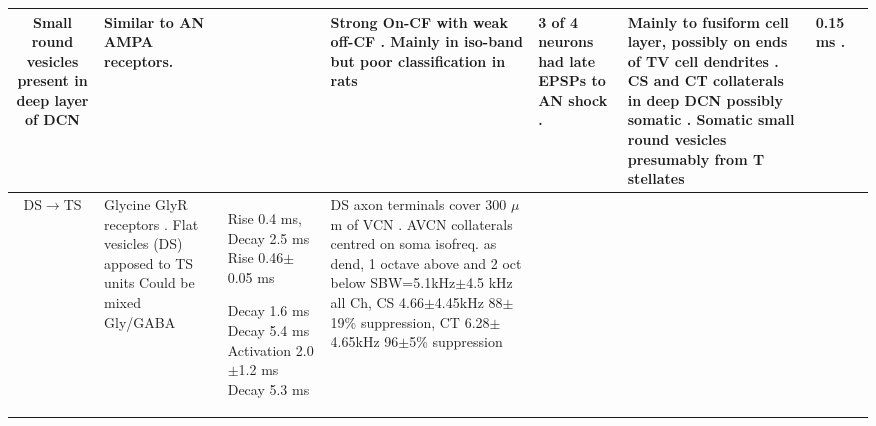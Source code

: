 \begin{longtable}{cYYYYYYY}
Small round vesicles present in deep layer of DCN \citep[guinea pig][]{Alibardi:1999}
& 
Similar to AN AMPA receptors.        
& %
& %
Strong On-CF with weak off-CF  \citep[See fig 13][]{OstapoffBensonEtAl:1999}. 
Mainly in iso-band but poor classification in rats \citep{DoucetRossEtAl:1999,FriedlandPongstapornEtAl:2003}         
& %
3 of 4 neurons had late EPSPs to AN shock \citep[very young mice][]{ZhangOertel:1993}.
\citep{OstapoffMorestEtAl:1999} 
& %
Mainly to fusiform cell layer, possibly on ends of TV cell dendrites \citep[mouse][]{OertelWuEtAl:1990}. 
CS and CT collaterals in deep DCN possibly somatic \citep[guinea pig][]{PalmerWallaceEtAl:2003}.
Somatic small round vesicles presumably from T stellates  \citep[guinea pig][]{Alibardi:1999}   
& %
0.15 ms \citep[min EPSP latency to VCN Glutamate puffs, main excitation at 0.3 ms, AN shock produces late EPSPs about 3 msec][]{ZhangOertel:1993}.
\\ \midrule
DS\ensuremath{\rightarrow}TS                        
& %
Glycine GlyR receptors \citep[mouse][]{FerragamoGoldingEtAl:1998a}.
Flat vesicles (DS) apposed to TS units \citep[cat][]{SmithRhode:1989}     
Could be mixed Gly/GABA \citep{AltschulerJuizEtAl:1993} 
& %
Rise 0.4 ms, Decay 2.5 ms \citep[spontaneous IPSCs in rat MNTB neurons,][]{AwatramaniTurecekEtAl:2005}
Rise 0.46$\pm$0.05 ms \citep[spontaneous IPSCs in AVCN bushy cells, mouse][]{LimOleskevichEtAl:2003}


Decay 1.6 ms \citep[mouse VCN,]{Oertel:1983}
Decay 5.4 ms \citep{OertelWickesberg:1993,WickesbergOertel:1993}    
Activation 2.0$\pm$1.2 ms Decay 5.3 ms \citep[Gly puffs at 22$^\circ$C (Q$_{10}$ 2.1) in  guinea pig VCN,][]{HartyManis:1998}
& %
DS axon terminals cover 300 $\mu$m of VCN \citep[mouse][]{OertelWuEtAl:1990}.
AVCN collaterals centred on soma isofreq. as dend, 1 octave above and 2 oct below \citep[gerbil][]{ArnottWallaceEtAl:2004} 
SBW=5.1kHz$\pm$4.5 kHz all Ch, CS 4.66$\pm$4.45kHz 88$\pm$19\% suppression, CT 6.28$\pm$ 4.65kHz    96$\pm$5\% suppression \citep{RhodeGreenberg:1994b}
& %
 

\end{longtable}
